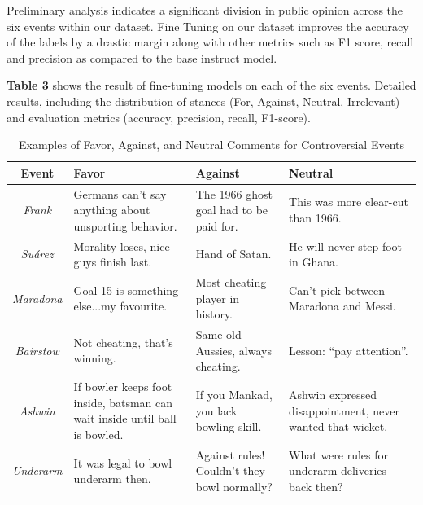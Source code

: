 \documentclass[sigconf, review]{acmart}
\begin{document}
Preliminary analysis indicates a significant division in public opinion across the six events within our dataset. 
Fine Tuning on our dataset improves the accuracy of the labels by a drastic margin along with other metrics such as F1 score, recall and precision as compared to the base instruct model.

\textbf{Table 3} shows the result of fine-tuning models on each of the six events.
Detailed results, including the distribution of stances (For, Against, Neutral, Irrelevant) and evaluation metrics (accuracy, precision, recall, F1-score).

\begin{table}[!htbp]
    \centering
    { %
      \small %
      \renewcommand{\arraystretch}{1.0}%
      \setlength{\tabcolsep}{3pt}%
      \begin{tabular}{|c|p{3.5cm}|p{3.5cm}|p{3.5cm}|}
          \hline
          \textbf{Event} & \textbf{Favor} & \textbf{Against} & \textbf{Neutral} \\
          \hline
          {\textit{Frank}} 
           & Germans can't say anything about unsporting behavior.  
           & The 1966 ghost goal had to be paid for. 
           & This was more clear-cut than 1966. \\
          \hline
          {\textit{Suárez}} 
           & Morality loses, nice guys finish last.  
           & Hand of Satan. 
           & He will never step foot in Ghana. \\
          \hline
          {\textit{Maradona}} 
           & Goal 15 is something else...my favourite. 
           & Most cheating player in history. 
           & Can't pick between Maradona and Messi. \\
          \hline
          {\textit{Bairstow}} 
           & Not cheating, that's winning. 
           & Same old Aussies, always cheating. 
           & Lesson: ``pay attention''. \\
          \hline
          {\textit{Ashwin}} 
           & If bowler keeps foot inside, batsman can wait inside until ball is bowled. 
           & If you Mankad, you lack bowling skill. 
           & Ashwin expressed disappointment, never wanted that wicket. \\
          \hline
          {\textit{Underarm}} 
           & It was legal to bowl underarm then. 
           & Against rules! Couldn't they bowl normally? 
           & What were rules for underarm deliveries back then? \\
          \hline
      \end{tabular}
    } %
    \caption{Examples of Favor, Against, and Neutral Comments for Controversial Events}
    \label{tab:event_comments}
\end{table}
\end{document}
